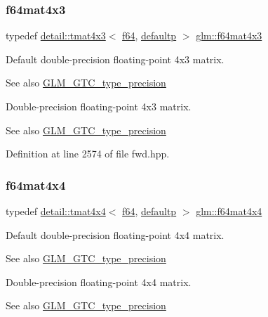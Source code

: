 \subsubsection{\texorpdfstring{f64mat4x3}{f64mat4x3}}
{\footnotesize\ttfamily typedef \hyperlink{structglm_1_1detail_1_1tmat4x3}{detail\+::tmat4x3}$<$ \hyperlink{group__gtc__type__precision_ga2bba392e555124b36cde6abba349bab3}{f64}, \hyperlink{namespaceglm_a0f04f086094c747d227af4425893f545a9d21ccd8b5a009ec7eb7677befc3bf51}{defaultp} $>$ \hyperlink{group__gtc__type__precision_gaca283f88500d9895afb939516e7372d1}{glm\+::f64mat4x3}}

Default double-\/precision floating-\/point 4x3 matrix. \begin{DoxySeeAlso}{See also}
\hyperlink{group__gtc__type__precision}{G\+L\+M\+\_\+\+G\+T\+C\+\_\+type\+\_\+precision}
\end{DoxySeeAlso}
Double-\/precision floating-\/point 4x3 matrix. \begin{DoxySeeAlso}{See also}
\hyperlink{group__gtc__type__precision}{G\+L\+M\+\_\+\+G\+T\+C\+\_\+type\+\_\+precision} 
\end{DoxySeeAlso}


Definition at line 2574 of file fwd.\+hpp.

\mbox{\label{group__gtc__type__precision_ga37a1ae1f6e67b5a6a06b1ee7c83f4bec}} 
\subsubsection{\texorpdfstring{f64mat4x4}{f64mat4x4}}
{\footnotesize\ttfamily typedef \hyperlink{structglm_1_1detail_1_1tmat4x4}{detail\+::tmat4x4}$<$ \hyperlink{group__gtc__type__precision_ga2bba392e555124b36cde6abba349bab3}{f64}, \hyperlink{namespaceglm_a0f04f086094c747d227af4425893f545a9d21ccd8b5a009ec7eb7677befc3bf51}{defaultp} $>$ \hyperlink{group__gtc__type__precision_ga37a1ae1f6e67b5a6a06b1ee7c83f4bec}{glm\+::f64mat4x4}}

Default double-\/precision floating-\/point 4x4 matrix. \begin{DoxySeeAlso}{See also}
\hyperlink{group__gtc__type__precision}{G\+L\+M\+\_\+\+G\+T\+C\+\_\+type\+\_\+precision}
\end{DoxySeeAlso}
Double-\/precision floating-\/point 4x4 matrix. \begin{DoxySeeAlso}{See also}
\hyperlink{group__gtc__type__precision}{G\+L\+M\+\_\+\+G\+T\+C\+\_\+type\+\_\+precision} 
\end{DoxySeeAlso}


